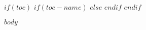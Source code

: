 \documentclass[12pt,a4paper]{article}
\begin{document}

$if(toc)$
{
  \clearpage
  \pagestyle{plain} %
  $if(toc-name)$
    \renewcommand{\contentsname}{\centering $toc-name$} %
  $else$
    \renewcommand{\contentsname}{\centering Table of Contents} %
  $endif$
  \tableofcontents
  \clearpage
  \pagestyle{fancy} %
}
$endif$

$body$
\end{document}
